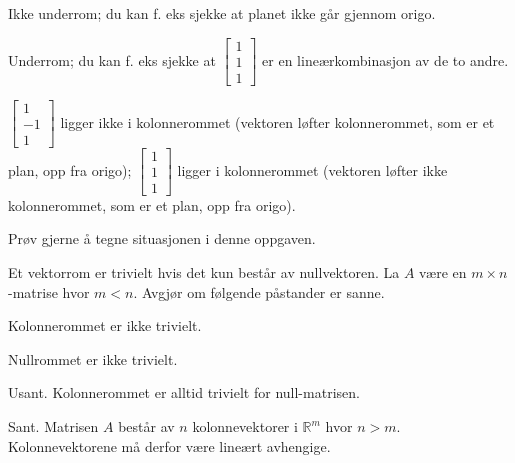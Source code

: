 \begin{losning}

\begin{punkt}
Ikke underrom; du kan f. eks sjekke at planet ikke går gjennom origo.
\end{punkt}

\begin{punkt}
Underrom; du kan f. eks sjekke at $\begin{bmatrix}
1\\
1\\
1
\end{bmatrix}$ er en lineærkombinasjon av de to andre.
\end{punkt}

\begin{punkt}
$\begin{bmatrix}
1\\
-1\\
1
\end{bmatrix}$ ligger ikke i kolonnerommet (vektoren løfter kolonnerommet, som er et plan, opp fra origo); $\begin{bmatrix}
1\\
1\\
1
\end{bmatrix}$ ligger i kolonnerommet (vektoren løfter ikke kolonnerommet, som er et plan, opp fra origo). 

\noindent
Prøv gjerne å tegne situasjonen i denne oppgaven.
\end{punkt}

\end{losning}

\begin{oppgave}
Et vektorrom er trivielt hvis det kun består av nullvektoren. La $A$ være en $m\times n$-matrise hvor $m<n$. Avgjør om følgende påstander er sanne.
\begin{punkt}
Kolonnerommet er ikke trivielt.
\end{punkt}

\begin{punkt}
Nullrommet er ikke trivielt.
\end{punkt}

\end{oppgave}

\begin{losning}

\begin{punkt}
Usant. Kolonnerommet er alltid trivielt for null-matrisen.
\end{punkt}

\begin{punkt}
Sant. Matrisen $A$ består av $n$ kolonnevektorer i $\mathbb{R}^m$ hvor $n>m$. Kolonnevektorene må derfor være lineært avhengige.
\end{punkt}

\end{losning}


